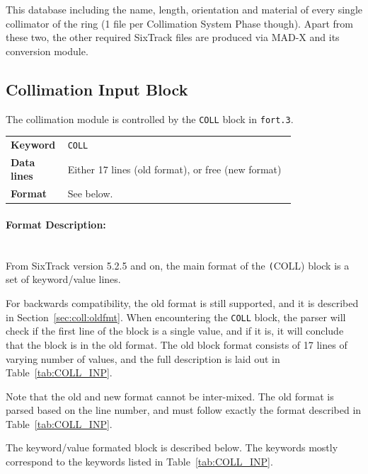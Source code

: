 This database including the name, length, orientation and material of every single collimator of the ring (1 file per Collimation System Phase though).
Apart from these two, the other required SixTrack files are produced via MAD-X and its conversion module.


\subsection{Collimation Input Block} \label{sec:coll:input}

The collimation module is controlled by the \texttt{COLL} block in \texttt{fort.3}.

\bigskip
\begin{tabular}{@{}lp{0.8\linewidth}}
    \textbf{Keyword}    & \texttt{COLL}\index{COLL} \\
    \textbf{Data lines} & Either 17 lines (old format), or free (new format)\\
    \textbf{Format}     & See below.
\end{tabular}

\paragraph{Format Description:}~\\

From SixTrack version 5.2.5 and on, the main format of the \texttt(COLL) block is a set of keyword/value lines.

For backwards compatibility, the old format is still supported, and it is described in Section~\ref{sec:coll:oldfmt}.
When encountering the \texttt{COLL} block, the parser will check if the first line of the block is a single value, and if it is, it will conclude that the block is in the old format.
The old block format consists of 17 lines of varying number of values, and the full description is laid out in Table~\ref{tab:COLL_INP}.

Note that the old and new format cannot be inter-mixed.
The old format is parsed based on the line number, and must follow exactly the format described in Table~\ref{tab:COLL_INP}.

The keyword/value formated block is described below.
The keywords mostly correspond to the keywords listed in Table~\ref{tab:COLL_INP}.

